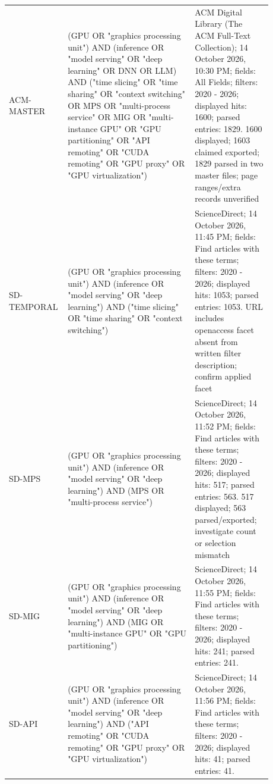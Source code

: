 \begin{longtable}{P{0.13\linewidth}P{0.46\linewidth}P{0.29\linewidth}}
ACM-MASTER & (GPU OR "graphics processing unit") AND (inference OR "model serving" OR "deep learning" OR DNN OR LLM) AND ("time slicing" OR "time sharing" OR "context switching" OR MPS OR "multi-process service" OR MIG OR "multi-instance GPU" OR "GPU partitioning" OR "API remoting" OR "CUDA remoting" OR "GPU proxy" OR "GPU virtualization") & ACM Digital Library (The ACM Full-Text Collection); 14 October 2026, 10:30 PM; fields: All Fields; filters: 2020 - 2026; displayed hits: 1600; parsed entries: 1829. 1600 displayed; 1603 claimed exported; 1829 parsed in two master files; page ranges/extra records unverified\\
SD-TEMPORAL & (GPU OR "graphics processing unit") AND (inference OR "model serving" OR "deep learning") AND ("time slicing" OR "time sharing" OR "context switching") & ScienceDirect; 14 October 2026, 11:45 PM; fields: Find articles with these terms; filters: 2020 - 2026; displayed hits: 1053; parsed entries: 1053. URL includes openaccess facet absent from written filter description; confirm applied facet\\
SD-MPS & (GPU OR "graphics processing unit") AND (inference OR "model serving" OR "deep learning") AND (MPS OR "multi-process service") & ScienceDirect; 14 October 2026, 11:52 PM; fields: Find articles with these terms; filters: 2020 - 2026; displayed hits: 517; parsed entries: 563. 517 displayed; 563 parsed/exported; investigate count or selection mismatch\\
SD-MIG & (GPU OR "graphics processing unit") AND (inference OR "model serving" OR "deep learning") AND (MIG OR "multi-instance GPU" OR "GPU partitioning") & ScienceDirect; 14 October 2026, 11:55 PM; fields: Find articles with these terms; filters: 2020 - 2026; displayed hits: 241; parsed entries: 241. \\
SD-API & (GPU OR "graphics processing unit") AND (inference OR "model serving" OR "deep learning") AND ("API remoting" OR "CUDA remoting" OR "GPU proxy" OR "GPU virtualization") & ScienceDirect; 14 October 2026, 11:56 PM; fields: Find articles with these terms; filters: 2020 - 2026; displayed hits: 41; parsed entries: 41. \\
\bottomrule\end{longtable}
